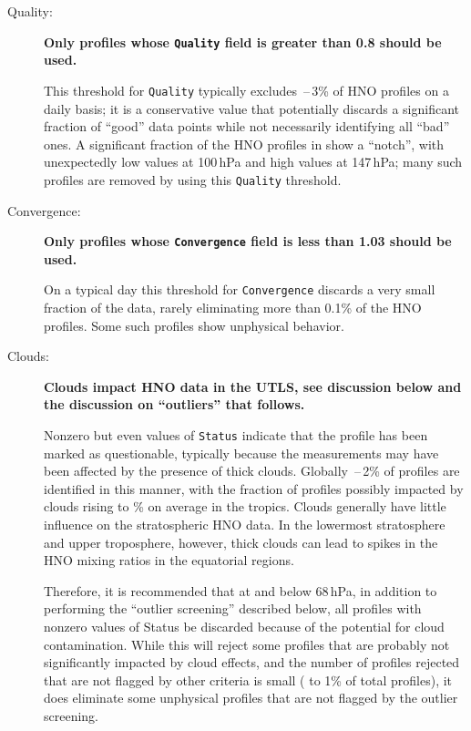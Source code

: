 \documentclass[11pt,draft]{report}
\newcommand{\screeningrule}[1]{\textbf{#1}\par}
\newcommand{\qualityrule}[1]{\screeningrule{Only
    profiles whose \texttt{Quality} field is greater than #1 should be used.}}
\newcommand{\convergencerule}[1]{\screeningrule{Only profiles whose
    \texttt{Convergence} field is less than #1 should be used.}}
\begin{document}
\begin{description}
\item[Quality:] \qualityrule{0.8}

  This threshold for \texttt{Quality} typically excludes
  \,--\,3\% of HNO profiles on a daily basis; it is a
  conservative value that potentially discards a significant fraction of
  ``good'' data points while not necessarily identifying all ``bad''
  ones.  A significant fraction of the HNO profiles in \thisv show a
  ``notch'', with unexpectedly low values at 100\,hPa and high values at
  147\,hPa; many such profiles are removed by using this
  \texttt{Quality} threshold.

\item[Convergence:] \convergencerule{1.03}

  On a typical day this threshold for \texttt{Convergence} discards a
  very small fraction of the data, rarely eliminating more than
  0.1\% of the HNO profiles.  Some such profiles show unphysical
  behavior.

\item[Clouds:] \screeningrule{Clouds impact HNO data in the UTLS,
    see discussion below and the discussion on ``outliers'' that follows.}

  Nonzero but even values of \texttt{Status} indicate that the profile
  has been marked as questionable, typically because the measurements
  may have been affected by the presence of thick clouds.  Globally
  \,--\,2\% of profiles are identified in this manner,
  with the fraction of profiles possibly impacted by clouds rising to
  \% on average in the tropics.  Clouds
  generally have little influence on the stratospheric HNO data.  In
  the lowermost stratosphere and upper troposphere, however, thick
  clouds can lead to spikes in the HNO mixing ratios in the
  equatorial regions.

  Therefore, it is recommended that at and below 68\,hPa, in addition to
  performing the ``outlier screening'' described below, all profiles
  with nonzero values of Status be discarded because of the potential
  for cloud contamination.  While this will reject some profiles that
  are probably not significantly impacted by cloud effects, and the
  number of profiles rejected that are not flagged by other criteria is
  small ( to 1\% of total profiles), it does eliminate
  some unphysical profiles that are not flagged by the outlier
  screening.


\end{description}
\end{document}
